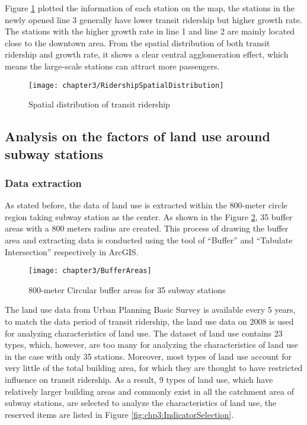 %
Figure \ref{fig:chp3:RidershipSpatialDistribution} plotted the information of each station on the map, the stations in the newly opened line 3 generally have lower transit ridership but higher growth rate. The stations with the higher growth rate in line 1 and line 2 are mainly located close to the downtown area. From the spatial distribution of both transit ridership and growth rate, it shows a clear central agglomeration effect, which means the large-scale stations can attract more passengers.

%
\begin{figure}[htbp]
	\centering
	\texttt{[image: chapter3/RidershipSpatialDistribution]}
	\caption{Spatial distribution of transit ridership}
	\label{fig:chp3:RidershipSpatialDistribution}
\end{figure}

%
\subsection{Analysis on the factors of land use around subway stations}
%
\subsubsection{Data extraction}
%
As stated before, the data of land use is extracted within the 800-meter circle region taking subway station as the center. As shown in the Figure \ref{fig:chp3:BufferAreas}, 35 buffer areas with a 800 meters radius are created. This process of drawing the buffer area and extracting data is conducted using the tool of “Buffer” and “Tabulate Intersection” respectively in ArcGIS.

%
\begin{figure}[htbp]
	\centering
	\texttt{[image: chapter3/BufferAreas]}
	\caption{800-meter Circular buffer areas for 35 subway stations}
	\label{fig:chp3:BufferAreas}
\end{figure}

%
The land use data from Urban Planning Basic Survey is available every 5 years, to match the data period of transit ridership, the land use data on 2008 is used for analyzing characteristics of land use. The dataset of land use contains 23 types, which, however, are too many for analyzing the characteristics of land use in the case with only 35 stations. Moreover, most types of land use account for very little of the total building area, for which they are thought to have restricted influence on transit ridership. As a result, 9 types of land use, which have relatively larger building areas and commonly exist in all the catchment area of subway stations, are selected to analyze the characteristics of land use, the reserved items are listed in Figure \ref{fig:chp3:IndicatorSelection}.

